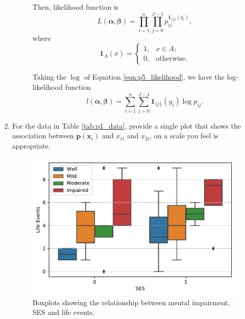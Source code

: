 \documentclass[letterpaper,11pt]{article}
\begin{document}
\begin{enumerate}
\begin{description}
    Then, likelihood function is
    \begin{equation}
      L\left(\bm\alpha, \bm\beta\right)
      = \prod_{i=1}^n \prod_{j=0}^{J-1} p_{ij}^{\mathbf{1}_{\{j\}}\left(y_i\right)},
      \label{eqn:p5_likelihood}
    \end{equation}
    where
    \begin{equation}
      \mathbf{1}_A\left(x\right) = \begin{cases}
        1,&x \in A; \\
        0,&\text{otherwise}.
      \end{cases}
      \label{eqn:p5_indicator}
    \end{equation}

    Taking the $\log$ of Equation \ref{eqn:p5_likelihood}, we have the
    log-likelihood function
    \begin{equation}
      l\left(\bm\alpha,\bm\beta\right)
      = \sum_{i=1}^n\sum_{j=0}^{J-1}\mathbf{1}_{\{j\}}\left(y_i\right) \log p_{ij}.
    \end{equation}    
  \end{description}  
\item For the data in Table \ref{tab:p1_data}, provide a single plot that shows
  the association between $\mathbf{p}\left(\mathbf{x}_i\right)$ and $x_{1i}$ and
  $x_{2i}$, on a scale you feel is appropriate.
  \label{part:p6}

  \begin{figure}
    \centering
    \includegraphics{p6_descriptive.pdf}
    \caption{Boxplots showing the relationship between mental impairment, SES
      and life events.}
    \label{fig:p6_descriptive}
  \end{figure}
  

\end{enumerate}
\end{document}
